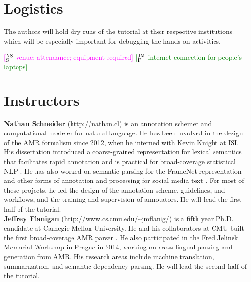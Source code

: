 \documentclass[11pt,letterpaper]{article}
\newcommand{\ensuretext}[1]{#1}
\newcommand{\jmfmarker}{\ensuretext{\textcolor{green}{\ensuremath{^{\textsc{JM}}_{\textsc{F}}}}}}
\newcommand{\nssmarker}{\ensuretext{\textcolor{magenta}{\ensuremath{^{\textsc{NS}}_{\textsc{S}}}}}}
\newcommand{\arkcomment}[3]{\ensuretext{\textcolor{#3}{[#1 #2]}}}
\newcommand{\jmf}[1]{\arkcomment{\jmfmarker}{#1}{green}}
\newcommand{\nss}[1]{\arkcomment{\nssmarker}{#1}{magenta}}
\begin{document}
\section{Logistics}

The authors will hold dry runs of the tutorial at their respective institutions, 
which will be especially important for debugging the hands-on activities. 

\nss{venue; attendance; equipment required}
\jmf{internet connection for people's laptops}

\section{Instructors}

\textbf{Nathan Schneider} (\url{http://nathan.cl}) is an annotation schemer and computational modeler for natural language. 
He has been involved in the design of the AMR formalism since 2012, 
when he interned with Kevin Knight at ISI. 
His dissertation introduced a coarse-grained representation for lexical semantics that facilitates rapid annotation 
and is practical for broad-coverage statistical NLP \citep{schneider-thesis}. 
He has also worked on semantic parsing for the FrameNet representation \citep{das-14} 
and other forms of annotation and processing for social media text \citep{gimpel-11,owoputi-13,schneider-13,kong-14,mohit-12}.
For most of these projects, he led the design of the annotation scheme, guidelines, and workflows, 
and the training and supervision of annotators.
He will lead the first half of the tutorial.\\[-5pt]

\noindent \textbf{Jeffrey Flanigan} (\url{http://www.cs.cmu.edu/~jmflanig/}) is a fifth year Ph.D. candidate at Carnegie Mellon University.
He and his collaborators at CMU built the first broad-coverage AMR parser \citep{flanigan-14}.
He also participated in the Fred Jelinek Memorial Workshop in Prague in 2014, working on cross-lingual parsing and generation from AMR.
His research areas include machine translation, summarization, and semantic dependency parsing.
He will lead the second half of the tutorial.


\setlength{\bibsep}{1pt}
{\fontsize{10}{12.25}\selectfont
}
\end{document}

